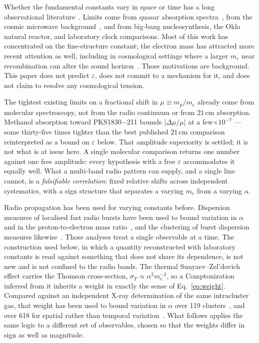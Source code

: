 \documentclass[aps,prd,twocolumn,superscriptaddress,nofootinbib,10pt]{revtex4-2}
\begin{document}
Whether the fundamental constants vary in space or time has a long observational
literature~\cite{Uzan2003,Uzan2011}. Limits come from quasar absorption
spectra~\cite{Webb1999,MurphyWebbFlambaum2003}, from the cosmic microwave
background~\cite{PlanckVaryingConstants,HartChluba2018}, and from big-bang nucleosynthesis, the
Oklo natural reactor, and laboratory clock comparisons. Most of this work has concentrated on the
fine-structure constant; the electron mass has attracted more recent attention as well, including
in cosmological settings where a larger $m_e$ near recombination can alter the sound
horizon~\cite{Sekiguchi2021,HartChluba2018}. Those motivations are background. This paper does not
predict $\varepsilon$, does not commit to a mechanism for it, and does not claim to resolve any
cosmological tension.

The tightest existing limits on a fractional shift in $\mu \equiv m_p/m_e$ already come from
molecular spectroscopy, not from the radio continuum or from $21\,$cm absorption. Methanol
absorption toward PKS1830$-$211 bounds $|\Delta\mu/\mu|$ at a few$\times 10^{-7}$
\cite{KanekarMethanol2015,BagdonaiteMethanol2013} --- some thirty-five times tighter than the
best published $21\,$cm comparison reinterpreted as a bound on $\varepsilon$ below. That amplitude
superiority is settled; it is not what is at issue here. A single molecular comparison returns one
number against one free amplitude: every hypothesis with a free $\varepsilon$ accommodates it
equally well. What a multi-band radio pattern can supply, and a single line cannot, is a
\emph{falsifiable correlation}: fixed relative shifts across independent systematics, with a sign
structure that separates a varying $m_e$ from a varying $\alpha$.

Radio propagation has been used for varying constants before. Dispersion measures of localised fast
radio bursts have been used to bound variation in $\alpha$ and in the proton-to-electron mass
ratio~\cite{Kalita2024}, and the clustering of burst dispersion measures likewise~\cite{WangXia2025}.
Those analyses treat a single observable at a time. The construction used below, in which a
quantity reconstructed with laboratory constants is read against something that does not share its
dependence, is not new and is not confined to the radio bands. The thermal Sunyaev--Zel'dovich
effect carries the Thomson cross-section, $\sigma_T \propto \alpha^{2} m_e^{-2}$, so a
Comptonization inferred from it inherits a weight in exactly the sense of Eq.~\eqref{eq:weight}.
Compared against an independent X-ray determination of the same intracluster gas, that weight has
been used to bound variation in $\alpha$ over 119 clusters~\cite{LiuAlphaClusters2021}, and over
618 for spatial rather than temporal variation~\cite{deMartinoAlphaClusters2016}. What follows
applies the same logic to a different set of observables, chosen so that the weights differ in sign
as well as magnitude.
\end{document}
